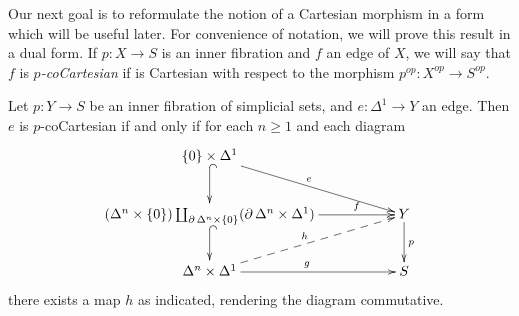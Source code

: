 Our next goal is to reformulate the notion of a Cartesian morphism in a form which will be useful later.
For convenience of notation, we will prove this result in a dual form. If $p: X \rightarrow S$ is an inner fibration and $f$ an edge of $X$, we will say that $f$ is {\it $p$-coCartesian} if is Cartesian with respect to the morphism $p^{op}: X^{op} \rightarrow S^{op}$.

\begin{proposition}\label{goouse}
Let $p: Y \rightarrow S$ be an inner fibration of simplicial sets, and $e: \Delta^1 \rightarrow
Y$ an edge. Then $e$ is $p$-coCartesian if and only if for each $n \geq 1$ and each diagram
$$ \xymatrix{ \{0\} \times \Delta^1 \ar[drr]^{e} \ar@{^{(}->}[d] & & \\
(\Delta^n \times \{0\}) \coprod_{ \bd \Delta^n \times \{0\} } ( \bd \Delta^n \times \Delta^1) \ar[rr]^-{f} \ar@{^{(}->}[d] & & Y \ar[d]^{p} \\
\Delta^n \times \Delta^1 \ar@{-->}[urr]^{h} \ar[rr]^{g} & & S }$$
there exists a map $h$ as indicated, rendering the diagram commutative.
\end{proposition}

